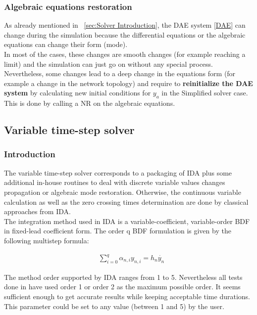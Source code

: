 \documentclass[a4paper, 12pt]{report}
\begin{document}
\subsubsection{Algebraic equations restoration}

As already mentioned in ~\ref{sec:Solver Introduction}, the \ac{DAE} system \eqref{DAE} can change during the simulation because the differential equations or the algebraic equations can change their form (mode). \\

In most of the cases, these changes are smooth changes (for example reaching a limit) and the simulation can just go on without any special process. Nevertheless, some changes lead to a deep change in the  equations form (for example a change in the network topology) and require to \textbf{reinitialize the \ac{DAE} system} by calculating new initial conditions for $y_a$ in the Simplified solver case. 
This is done by calling a \ac{NR} on the algebraic equations.

\subsection{Variable time-step solver}

\subsubsection{Introduction}

The variable time-step solver corresponds to a packaging of \ac{IDA} plus some additional in-house routines to deal with discrete variable values changes propagation or algebraic mode restoration. Otherwise, the continuous variable calculation as well as the zero crossing times determination are done by classical approaches from \ac{IDA}. \\

The integration method used in \ac{IDA} is a variable-coefficient, variable-order \ac{BDF} in fixed-lead coefficient form. The order q BDF formulation is given by the following multistep formula:

\begin{equation}
\begin{aligned}
& \sum\limits_{i=0}^q \alpha_{n,i} y_{n,i} = h_{n}\dot{y_n}
\end{aligned}
\end{equation}

The method order supported by \ac{IDA} ranges from 1 to 5. Nevertheless all tests done in \Dynawo have used order 1 or order 2 as the maximum possible order. It seems sufficient enough to get accurate results while keeping acceptable time durations. This parameter could be set to any value (between 1 and 5) by the user. \\
\end{document}
